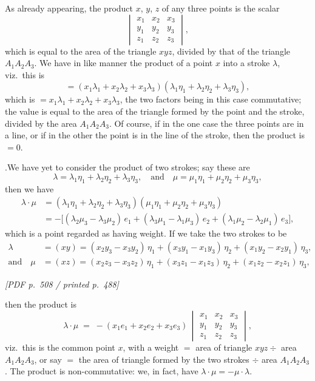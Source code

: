 \documentclass[11pt]{article}
\begin{document}
As already appearing, the product $x$, $y$, $z$ of any three points is the scalar
\[
\begin{vmatrix} x_{1} & x_{2} & x_{3} \\ y_{1} & y_{2} & y_{3} \\ z_{1} & z_{2} & z_{3} \end{vmatrix},
\]
which is equal to the area of the triangle $xyz$, divided by that of the triangle $A_{1}A_{2}A_{3}$. We have in like manner the product of a point $x$ into a stroke $\lambda$, viz.\ this is
\[
= (x_{1}\lambda_{1} + x_{2}\lambda_{2} + x_{3}\lambda_{3})(\lambda_{1}\eta_{1} + \lambda_{2}\eta_{2} + \lambda_{3}\eta_{3}),
\]
which is $= x_{1}\lambda_{1} + x_{2}\lambda_{2} + x_{3}\lambda_{3}$, the two factors being in this case commutative; the value is equal to the area of the triangle formed by the point and the stroke, divided by the area $A_{1}A_{2}A_{3}$. Of course, if in the one case the three points are in a line, or if in the other the point is in the line of the stroke, then the product is $= 0$.

\medskip

.\quad We have yet to consider the product of two strokes; say these are
\[
\lambda = \lambda_{1}\eta_{1} + \lambda_{2}\eta_{2} + \lambda_{3}\eta_{3},\quad \text{and}\quad \mu = \mu_{1}\eta_{1} + \mu_{2}\eta_{2} + \mu_{3}\eta_{3},
\]
then we have
\begin{align*}
\lambda\cdot\mu &= (\lambda_{1}\eta_{1} + \lambda_{2}\eta_{2} + \lambda_{3}\eta_{3})(\mu_{1}\eta_{1} + \mu_{2}\eta_{2} + \mu_{3}\eta_{3}) \\
&= -\bigl[(\lambda_{2}\mu_{3} - \lambda_{3}\mu_{2})\,e_{1} + (\lambda_{3}\mu_{1} - \lambda_{1}\mu_{3})\,e_{2} + (\lambda_{1}\mu_{2} - \lambda_{2}\mu_{1})\,e_{3}\bigr],
\end{align*}
which is a point regarded as having weight. If we take the two strokes to be
\begin{align*}
\lambda &= (xy) = (x_{2}y_{3} - x_{3}y_{2})\,\eta_{1} + (x_{3}y_{1} - x_{1}y_{3})\,\eta_{2} + (x_{1}y_{2} - x_{2}y_{1})\,\eta_{3}, \\
\text{and}\quad \mu &= (xz) = (x_{2}z_{3} - x_{3}z_{2})\,\eta_{1} + (x_{3}z_{1} - x_{1}z_{3})\,\eta_{2} + (x_{1}z_{2} - x_{2}z_{1})\,\eta_{3},
\end{align*}

\vfill
\noindent\textit{[PDF p.~508 / printed p.~488]}
\newpage

\noindent then the product is
\[
\lambda\cdot\mu\;=\;-(x_{1}e_{1} + x_{2}e_{2} + x_{3}e_{3})\,\begin{vmatrix} x_{1} & x_{2} & x_{3} \\ y_{1} & y_{2} & y_{3} \\ z_{1} & z_{2} & z_{3} \end{vmatrix},
\]
viz.\ this is the common point $x$, with a weight $=$ area of triangle $xyz \div$ area $A_{1}A_{2}A_{3}$, or say $=$ the area of triangle formed by the two strokes $\div$ area $A_{1}A_{2}A_{3}$. The product is non-commutative: we, in fact, have $\lambda\cdot\mu = -\mu\cdot\lambda$.
\end{document}
